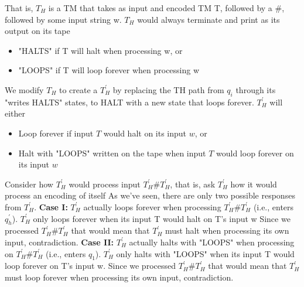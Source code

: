 \documentclass{report}
\begin{document}
\begin{itemize}
            \bigbreak \noindent 
            That is, $T_{H}$ is a TM that takes as input and encoded TM T, followed by a \#, followed by some input string w.
            \bigbreak \noindent 
            $T_{H}$ would always terminate and print as its output on its tape
            \begin{itemize}
                \item "HALTS" if T will halt when processing w, or
                \item "LOOPS" if T will loop forever when processing w
            \end{itemize}
            \bigbreak \noindent 
            \bigbreak \noindent 
            We modify $T_{H}$ to create a $T_{H}^{\prime} $ by replacing the TH path from $q_{i}$ through its "writes HALTS" states, to HALT with a new state that loops forever.
            \bigbreak \noindent 
            \bigbreak \noindent 
            $T_{H}^{\prime} $ will either
            \begin{itemize}
                \item Loop forever if input $T$ would halt on its input $w$, or
                \item Halt with "LOOPS" written on the tape when input $T$ would loop forever on its input $w$
            \end{itemize}
            \bigbreak \noindent 
            Consider how $T_{H}^{\prime}$ would process input $T_{H}^{\prime}\#T_{H}^{\prime}$, that is, ask $T_{H}^{\prime}$ how it would process an encoding of itself
            \bigbreak \noindent 
            As we've seen, there are only two possible responses from $T_{H}^{\prime} $.
            \bigbreak \noindent 
            \textbf{Case I:} $T_{H}^{\prime} $ actually loops forever when processing $T_{H}^{\prime}\#T_{H}^{\prime}$ (i.e., enters $q_{h}^{\prime} $). $T_{H}^{\prime} $ only loops forever when its input T would halt on T's input w
            \bigbreak \noindent 
            Since we processed $T_{H}^{\prime}\#T_{H}^{\prime}$ that would mean that $T_{H}^{\prime}$ must halt when processing its own input, contradiction.
            \bigbreak \noindent 
            \textbf{Case II:} $T_{H}^{\prime}$ actually halts with "LOOPS" when processing on $T_{H}^{\prime}\#T_{H}^{\prime} $ (i.e., enters $q_{1}$). 
            $T_{H}^{\prime}$ only halts with "LOOPS" when its input T would loop forever on T's input w.
            \bigbreak \noindent 
            Since we processed $T_{H}^{\prime}\#T_{H}^{\prime}$ that would mean that $T_{H}^{\prime} $ must loop forever when processing its own input, contradiction.

\end{itemize}
\end{document}
